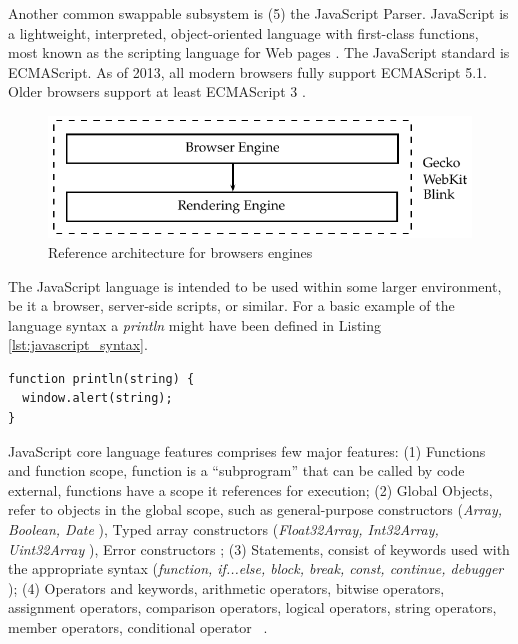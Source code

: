 Another common swappable subsystem is (5) the JavaScript Parser. JavaScript is a lightweight, interpreted, object-oriented language with first-class functions, most known as the scripting language for Web pages \cite{Gecko2013}. The JavaScript standard is ECMAScript. As of 2013, all modern browsers fully support ECMAScript 5.1. Older browsers support at least ECMAScript 3 \cite{Gecko2013} \cite{International2009}.

\begin{figure}[!htb]
  \centering
  \includegraphics{chapters/basic_concepts/web_architecture_engines.pdf}
  \caption{Reference architecture for browsers engines}
  \label{figure:web_architecture_engines}
\end{figure}

The JavaScript language is intended to be used within some larger environment, be it a browser, server-side scripts, or similar. For a basic example of the language syntax a \textit{println} might have been defined in Listing \ref{lst:javascript_syntax}.

\begin{lstlisting}[label={lst:javascript_syntax},caption=Basic example of JavaScript syntax]
function println(string) {
  window.alert(string);
}
\end{lstlisting}

JavaScript core language features comprises few major features: (1) Functions and function scope, function is a ``subprogram'' that can be called by code external, functions have a scope it references for execution; (2) Global Objects, refer to objects in the global scope, such as general-purpose constructors (\textit{Array, Boolean, Date} \etc), Typed array constructors (\textit{Float32Array, Int32Array, Uint32Array} \etc), Error constructors \etc; (3) Statements, consist of keywords used with the appropriate syntax (\textit{function, if...else, block, break, const, continue, debugger \etc}); (4) Operators and keywords, arithmetic operators, bitwise operators, assignment operators, comparison operators, logical operators, string operators, member operators, conditional operator \etc\ \cite{MDN2013}.

